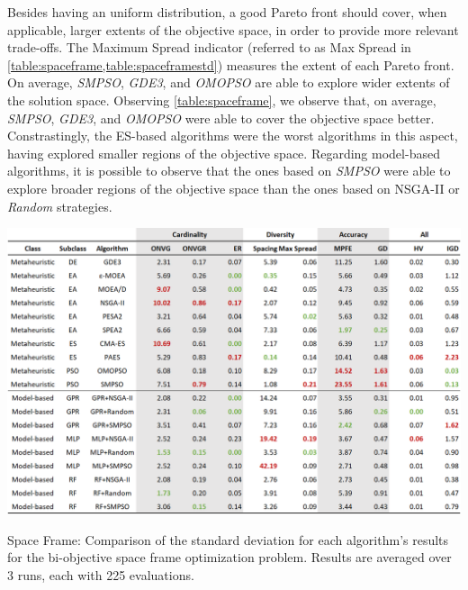 Besides having an uniform distribution, a good Pareto front should cover, when applicable, larger extents of the objective space, in order to provide more relevant trade-offs. The Maximum Spread indicator (referred to as Max Spread in \cref{table:spaceframe,table:spaceframestd}) measures the extent of each Pareto front. On average, \textit{SMPSO}, \textit{GDE3}, and \textit{OMOPSO} are able to explore wider extents of the solution space. Observing \cref{table:spaceframe}, we observe that, on average, \textit{SMPSO}, \textit{GDE3}, and \textit{OMOPSO} were able to cover the objective space better. Constrastingly, the \ac{ES}-based algorithms were the worst algorithms in this aspect, having explored smaller regions of the objective space. Regarding model-based algorithms, it is possible to observe that the ones based on \textit{SMPSO} were able to explore broader regions of the objective space than the ones based on \ac{NSGA-II} or \textit{Random} strategies. 

\begin{table}[h!]
	\centering
	\includegraphics[width=\textwidth]{Images/Evaluation/caadria/Results_Std_20190416.PNG}
	\caption[Space Frame: Standard deviation values of the algorithms' results]{Space Frame: Comparison of the standard deviation for each algorithm's results for the bi-objective space frame optimization problem. Results are averaged over 3 runs, each with 225 evaluations.}
	\label{table:spaceframestd}
\end{table}

